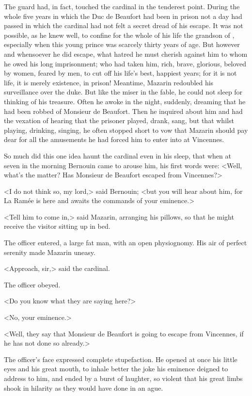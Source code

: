 The guard had, in fact, touched the cardinal in the tenderest point. During the whole five years in which the Duc de Beaufort had been in prison not a day had passed in which the cardinal had not felt a secret dread of his escape. It was not possible, as he knew well, to confine for the whole of his life the grandson of , especially when this young prince was scarcely thirty years of age. But however and whensoever he did escape, what hatred he must cherish against him to whom he owed his long imprisonment; who had taken him, rich, brave, glorious, beloved by women, feared by men, to cut off his life's best, happiest years; for it is not life, it is merely existence, in prison! Meantime, Mazarin redoubled his surveillance over the duke. But like the miser in the fable, he could not sleep for thinking of his treasure. Often he awoke in the night, suddenly, dreaming that he had been robbed of Monsieur de Beaufort. Then he inquired about him and had the vexation of hearing that the prisoner played, drank, sang, but that whilst playing, drinking, singing, he often stopped short to vow that Mazarin should pay dear for all the amusements he had forced him to enter into at Vincennes.

So much did this one idea haunt the cardinal even in his sleep, that when at seven in the morning Bernouin came to arouse him, his first words were: <Well, what's the matter? Has Monsieur de Beaufort escaped from Vincennes?>

<I do not think so, my lord,> said Bernouin; <but you will hear about him, for La Ramée is here and awaits the commands of your eminence.>

<Tell him to come in,> said Mazarin, arranging his pillows, so that he might receive the visitor sitting up in bed.

The officer entered, a large fat man, with an open physiognomy. His air of perfect serenity made Mazarin uneasy.

<Approach, sir,> said the cardinal.

The officer obeyed.

<Do you know what they are saying here?>

<No, your eminence.>

<Well, they say that Monsieur de Beaufort is going to escape from Vincennes, if he has not done so already.>

The officer's face expressed complete stupefaction. He opened at once his little eyes and his great mouth, to inhale better the joke his eminence deigned to address to him, and ended by a burst of laughter, so violent that his great limbs shook in hilarity as they would have done in an ague.

